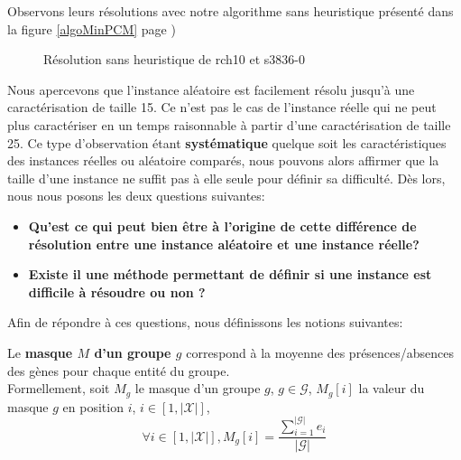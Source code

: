 Observons leurs résolutions avec notre algorithme sans heuristique présenté dans la figure \ref{algoMinPCM} page \pageref{algoMinPCM})
\begin{figure}[H]
\centering
	\begin{minipage}[c]{0.49\linewidth}
	\centering
	
	\end{minipage}
	\begin{minipage}[c]{0.49\linewidth}
	\centering
	
	\end{minipage}
\caption{Résolution sans heuristique de rch10 et s3836-0}
\end{figure} 

Nous apercevons que l'instance aléatoire est facilement résolu jusqu'à une caractérisation de taille 15. Ce n'est pas le cas de l'instance réelle qui ne peut plus caractériser en un temps raisonnable à partir d'une caractérisation de taille 25. Ce type d'observation étant \textbf{systématique} quelque soit les caractéristiques des instances réelles ou aléatoire comparés, nous pouvons alors affirmer que la taille d'une instance ne suffit pas à elle seule pour définir sa difficulté. Dès lors, nous nous posons les deux questions suivantes:\\

\begin{itemize}
\item \textbf{Qu'est ce qui peut bien être à l'origine de cette différence de résolution entre une instance aléatoire et une instance réelle?}
\item \textbf{Existe il une méthode permettant de définir si une instance est difficile à résoudre ou non ?}\\
\end{itemize}
Afin de répondre à ces questions, nous définissons les notions suivantes:

\begin{definition}
Le \textbf{masque $M$ d'un groupe $g$} correspond à la moyenne des présences/absences des gènes pour chaque entité du groupe.\\
Formellement, soit $M_g$ le masque d'un groupe $g$, $g \in \mathcal{G}$, $M_g[i]$ la valeur du masque $g$ en position $i$, $i \in [1,|\mathcal{X}|]$,
$$\forall i \in  [1, |\mathcal{X}|], M_g[i]= \frac{\sum_{i=1}^{|\mathcal{G}|}e_i}{|\mathcal{G}|} $$
\end{definition}

